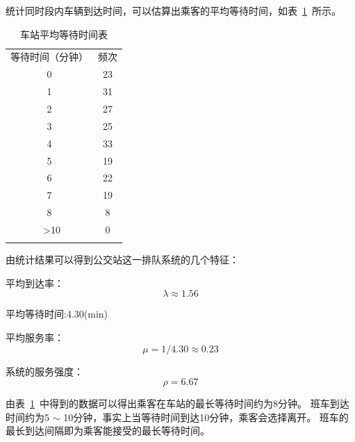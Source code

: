 统计同时段内车辆到达时间，可以估算出乘客的平均等待时间，如表~\ref{teble_2}~所示。
\begin{table}[htbp!]
    \centering
    \caption{车站平均等待时间表}\label{teble_2}
    \begin{tabular}{cc}
        \whline
        等待时间（分钟） & 频次 \\
        0 & 23\\
        1 & 31\\
        2 & 27\\
        3 & 25\\
        4 & 33\\
        5 & 19\\
        6 & 22\\
        7 & 19\\
        8 & 8\\\
        >10&0 \\
        \whline
    \end{tabular}
\end{table}

由统计结果可以得到公交站这一排队系统的几个特征：

平均到达率：$$\lambda \approx 1.56$$ 

平均等待时间:4.30(min)

平均服务率：$$\mu = 1/4.30 \approx 0.23$$

系统的服务强度：$$\rho = 6.67 $$

由表~\ref{teble_2}~中得到的数据可以得出乘客在车站的最长等待时间约为8分钟。
班车到达时间约为5 $\sim$ 10分钟，事实上当等待时间到达10分钟，乘客会选择离开。
班车的最长到达间隔即为乘客能接受的最长等待时间。

